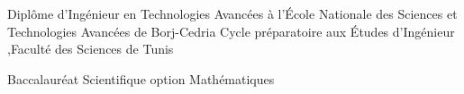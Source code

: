 %
%
%


\begin{scholarship}
					{Diplôme d'Ingénieur en Technologies Avancées à l'École Nationale des Sciences et Technologies Avancées de Borj-Cedria }
					{Cycle préparatoire aux Études d'Ingénieur ,Faculté des Sciences de Tunis}

					{Baccalauréat Scientifique option Mathématiques}
\end{scholarship}